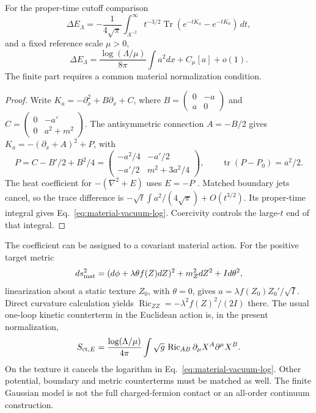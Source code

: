 \begin{proposition}
\label{prop:material-vacuum-coefficient}
For the proper-time cutoff comparison
\[
 \Delta E_\Lambda=-\frac1{4\sqrt\pi}
 \int_{\Lambda^{-2}}^\infty t^{-3/2}
 \operatorname{Tr}(e^{-tK_a}-e^{-tK_0})\,dt,
\]
and a fixed reference scale $\mu>0$,
\begin{equation}\label{eq:material-vacuum-log}
 \Delta E_\Lambda=\frac{\log(\Lambda/\mu)}{8\pi}
                         \int a^2dx+C_\mu[a]+o(1).
\end{equation}
The finite part requires a common material normalization condition.
\end{proposition}
\begin{proof}
Write $K_a=-\partial_x^2+B\partial_x+C$, where
$B=\left(\begin{smallmatrix}0&-a\\a&0\end{smallmatrix}\right)$ and
$C=\left(\begin{smallmatrix}0&-a'\\0&a^2+m^2\end{smallmatrix}\right)$.
The antisymmetric connection $A=-B/2$ gives
$K_a=-(\partial_x+A)^2+P$, with
\[
 P=C-B'/2+B^2/4=
 \begin{pmatrix}-a^2/4&-a'/2\\-a'/2&m^2+3a^2/4\end{pmatrix},
 \qquad \operatorname{tr}(P-P_0)=a^2/2.
\]
The heat coefficient for $-(\nabla^2+E)$ uses $E=-P$
\cite[Eq.~(4.27)]{Vassilevich2003}. Matched boundary jets cancel,
so the trace difference is
$-\sqrt t\int a^2/(4\sqrt\pi)+O(t^{3/2})$.
Its proper-time integral gives Eq.~\eqref{eq:material-vacuum-log}.
Coercivity controls the large-$t$ end of that integral.
\end{proof}

The coefficient can be assigned to a covariant material action. For
the positive target metric
\[
 ds_{\rm mat}^2=(d\phi+\lambda\theta f(Z)dZ)^2
                  +m_Z^2dZ^2+I d\theta^2,
\]
linearization about a static texture $Z_0$, with $\theta=0$, gives
$a=\lambda f(Z_0)Z_0'/\sqrt I$. Direct curvature calculation yields
$\operatorname{Ric}_{ZZ}=-\lambda^2f(Z)^2/(2I)$ there.
The usual one-loop kinetic counterterm in the Euclidean action
\cite[Section~7.2]{Friedan1985} is, in the present normalization,
\[
 S_{{\rm ct},E}=\frac{\log(\Lambda/\mu)}{4\pi}
 \int\sqrt g\,\operatorname{Ric}_{AB}
                         \partial_\mu X^A\partial^\mu X^B.
\]
On the texture it cancels the logarithm in
Eq.~\eqref{eq:material-vacuum-log}. Other potential, boundary and
metric counterterms must be matched as well. The finite Gaussian model
is not the full charged-fermion contact or an all-order continuum construction.

